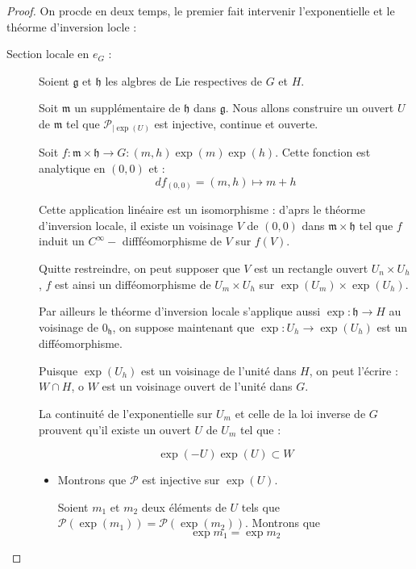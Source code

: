 \begin{proof}
On procde en deux temps, le premier fait intervenir l'exponentielle et le th\'eorme d'inversion locle :

\par
\begin{description}
\item[Section locale en $e_G$ :] Soient $\mathfrak{g}$ et $\mathfrak{h}$ les algbres de Lie respectives de $G$ et $H$.

\par
Soit $\mathfrak{m}$ un suppl\'ementaire de $\mathfrak{h}$ dans $\mathfrak{g}$. %
Nous allons construire un ouvert $U$ de $\mathfrak{m}$ tel que $\mathcal{P}_{|\exp(U)}$ est injective, continue et ouverte.

\ligneinter
Soit $f:\mathfrak{m}\times\mathfrak{h}\rightarrow G:(m,h)\exp(m)\exp(h)$. Cette fonction est analytique en $(0,0)$ et :
\[df_{(0,0)}=(m,h)\mapsto m+h\]

Cette application lin\'eaire est un isomorphisme : d'aprs le th\'eorme d'inversion locale, %
il existe un voisinage $V$ de $(0,0)$ dans $\mathfrak{m}\times\mathfrak{h}$ tel que $f$ induit un $C^{\infty}-$ difff\'eomorphisme de $V$ sur $f(V)$.

\par
Quitte  restreindre, on peut supposer que $V$ est un rectangle ouvert $U_n\times U_h$, $f$ est ainsi un diff\'eomorphisme de $U_m\times U_h$ sur $\exp(U_m)\times\exp(U_h)$.

\par
Par ailleurs le th\'eorme d'inversion locale s'applique aussi  $\exp :\mathfrak{h}\rightarrow H$ au voisinage de $0_{\mathfrak{h}}$, %
on suppose maintenant que $\exp :U_h\rightarrow \exp(U_h)$ est un diff\'eomorphisme.

\par
Puisque $\exp(U_h)$ est un voisinage de l'unit\'e dans $H$, on peut l'\'ecrire : $W\cap H$, o $W$ est un voisinage ouvert de l'unit\'e dans $G$.

\par
La continuit\'e de l'exponentielle sur $U_m$ et celle de la loi inverse de $G$ prouvent qu'il existe un ouvert $U$ de $U_m$ tel que :

\[\exp(-U)\exp(U)\subset W\]
\begin{itemize}
\item Montrons que $\mathcal{P}$ est injective sur $\exp(U)$.

\par
Soient $m_1$ et $m_2$ deux \'el\'ements de $U$ tels que $\mathcal{P}(\exp(m_1))=\mathcal{P}(\exp(m_2))$. %
Montrons que \[\exp m_1=\exp m_2\]


\end{itemize}
\end{description}
\end{proof}

